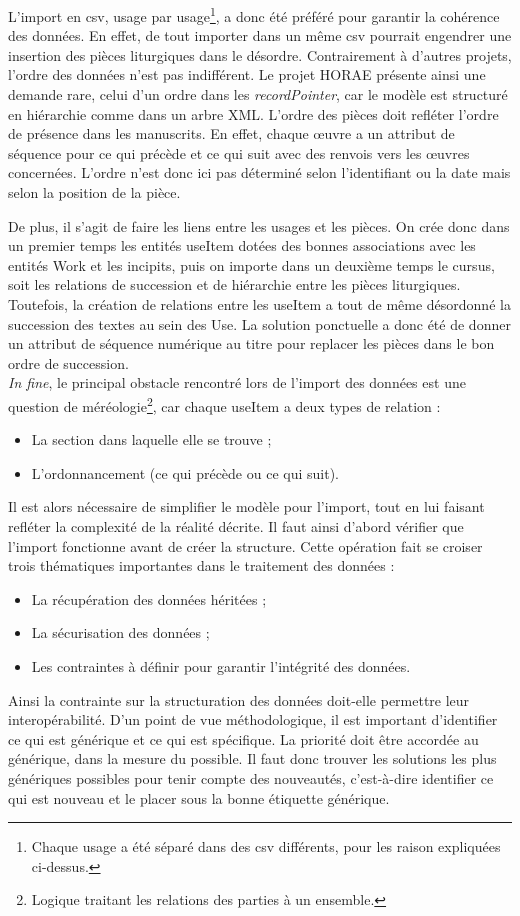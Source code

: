 \documentclass[a4paper,12pt,twoside]{book}
\begin{document}
L'import en csv, usage par usage\footnote{Chaque usage a été séparé dans des csv différents, pour les raison expliquées ci-dessus.}, a donc été préféré pour garantir la cohérence des données. En effet, de tout importer dans un même csv pourrait engendrer une insertion des pièces liturgiques dans le désordre. Contrairement à d'autres projets, l'ordre des données n'est pas indifférent. Le projet HORAE présente ainsi une demande rare, celui d'un ordre dans les \textit{recordPointer}, car le modèle est structuré en hiérarchie comme dans un arbre XML. L’ordre des pièces doit refléter l’ordre de présence dans les manuscrits. En effet, chaque œuvre a un attribut de séquence pour ce qui précède et ce qui suit avec des renvois vers les œuvres concernées. L’ordre n'est donc ici pas déterminé selon l’identifiant ou la date mais selon la position de la pièce. 

De plus, il s’agit de faire les liens entre les usages et les pièces. On crée donc dans un premier temps les entités useItem dotées des bonnes associations avec les entités Work et les incipits, puis on importe dans un deuxième temps le cursus, soit les relations de succession et de hiérarchie entre les pièces liturgiques. Toutefois, la création de relations entre les useItem a tout de même désordonné la succession des textes au sein des Use. La solution ponctuelle a donc été de donner un attribut de séquence numérique au titre pour replacer les pièces dans le bon ordre de succession.\\

\textit{In fine}, le principal obstacle rencontré lors de l'import des données est une question de méréologie\footnote{Logique traitant les relations des parties à un ensemble.}, car chaque useItem a deux types de relation :
\begin{itemize}
    \item La section dans laquelle elle se trouve ;
    \item L'ordonnancement (ce qui précède ou ce qui suit).
\end{itemize}

Il est alors nécessaire de simplifier le modèle pour l’import, tout en lui faisant refléter la complexité de la réalité décrite. Il faut ainsi d’abord vérifier que l’import fonctionne avant de créer la structure. Cette opération fait se croiser trois thématiques importantes dans le traitement des données : 
\begin{itemize}
    \item La récupération des données héritées ;
    \item La sécurisation des données ;
    \item Les contraintes à définir pour garantir l'intégrité des données.
\end{itemize}
Ainsi la contrainte sur la structuration des données doit-elle permettre leur interopérabilité. D'un point de vue méthodologique, il est important d'identifier ce qui est générique et ce qui est spécifique. La priorité doit être accordée au générique, dans la mesure du possible. Il faut donc trouver les solutions les plus génériques possibles pour tenir compte des nouveautés, c'est-à-dire identifier ce qui est nouveau et le placer sous la bonne étiquette générique.
\end{document}
